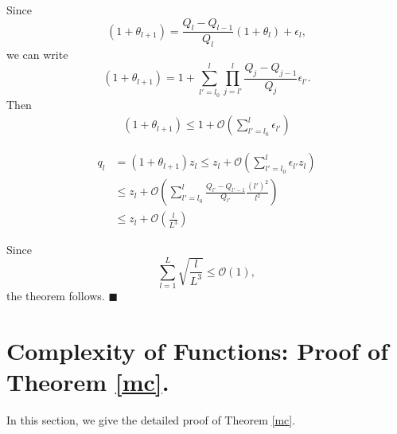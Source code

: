 \documentclass{article}
\newcommand{\cO}{\mathcal{O}}
\newcommand*{\QEDA}{\hfill\ensuremath{\blacksquare}}%
\begin{document}
Since
\begin{equation}
(1+\theta_{l+1})=\frac{Q_l-Q_{l-1}}{Q_l}(1+\theta_l)+\epsilon_l,
\end{equation}
we can write
\begin{equation}
(1+\theta_{l+1})=1+\sum_{l'=l_0}^{l}\prod_{j=l'}^{l}\frac{Q_j-Q_{j-1}}{Q_j}\epsilon_{l'}.
\end{equation}
Then
\begin{equation}
\begin{aligned}
(1+\theta_{l+1})\leq  1+\cO(\sum_{l'=l_0}^{l}\epsilon_{l'})
\end{aligned}
\end{equation}

\begin{equation}
\begin{aligned}
q_l&=(1+\theta_{l+1})z_{l}\leq z_l+ \cO(\sum_{l'=l_0}^{l}\epsilon_{l'}z_l)\\
&\leq z_l+\cO(\sum_{l'=l_0}^{l}\frac{Q_{l'}-Q_{l'-1}}{Q_{l'}}\frac{(l')^2}{l^2})\\
&\leq z_l+\cO(\frac{l}{L^3})
\end{aligned}
\end{equation}

Since
\begin{equation}
\sum_{l=1}^L \sqrt{\frac{l}{L^3}}\leq \cO(1),
\end{equation}
 the theorem follows.
\QEDA


\section{Complexity of Functions: Proof of Theorem \ref{mc}.}
In this section, we give the detailed proof of Theorem \ref{mc}.
\end{document}
